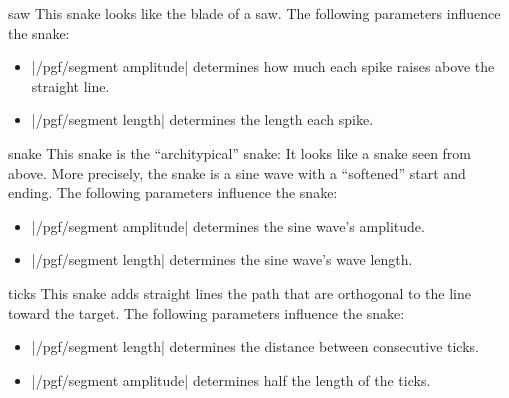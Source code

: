 \begin{snake}{saw}
  This snake looks like the blade of a saw. The following parameters
  influence the snake:
  \begin{itemize}
  \item |/pgf/segment amplitude|
    determines how much each spike raises above the straight line.
  \item |/pgf/segment length|
    determines the length each spike.
  \end{itemize}
\begin{codeexample}[]
\end{codeexample}
\end{snake}


\begin{snake}{snake}
  This snake is the ``architypical'' snake: It looks like a snake seen
  from above. More precisely, the snake is a sine wave with a
  ``softened'' start and ending. The following parameters influence
  the snake: 
  \begin{itemize}
  \item |/pgf/segment amplitude|
    determines the sine wave's amplitude.
  \item |/pgf/segment length|
    determines the sine wave's wave length.
  \end{itemize}
\begin{codeexample}[]
\end{codeexample}
\end{snake}


\begin{snake}{ticks}
  This snake adds straight lines  the path that are orthogonal to the
  line toward the target. The following parameters influence the snake: 
  \begin{itemize}
  \item |/pgf/segment length|
    determines the distance between consecutive ticks.
  \item |/pgf/segment amplitude|
    determines half the length of the ticks.
  \end{itemize}
\begin{codeexample}[]
\end{codeexample}
\end{snake}

